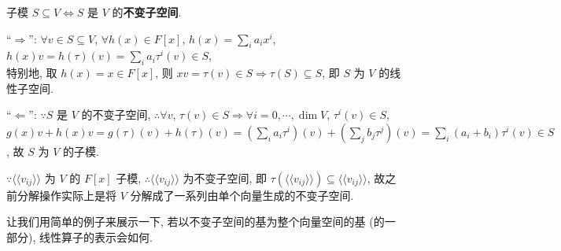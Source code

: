 \documentclass{note}
\begin{document}
\begin{thm}[(课本定理 7.5)]
    子模 $S\subseteq V\Longleftrightarrow S$ 是 $V$ 的\textbf{不变子空间}.
\end{thm}
\begin{pf}
    ``$\Longrightarrow$'': $\forall v\in S\subseteq V$, $\forall h(x)\in F[x]$, $h(x)=\sum_ia_ix^i$, $h(x)v=h(\tau)(v)=\sum_ia_i\tau^i(v)\in S$,\\
    特别地, 取 $h(x)=x\in F[x]$, 则 $xv=\tau(v)\in S\Longrightarrow\tau(S)\subseteq S$, 即 $S$ 为 $V$ 的线性子空间.

    ``$\Longleftarrow$'': $\because S$ 是 $V$ 的不变子空间, $\therefore\forall v$, $\tau(v)\in S\Longrightarrow\forall i=0,\cdots,\dim V$, $\tau^i(v)\in S$,\\
    $g(x)v+h(x)v=g(\tau)(v)+h(\tau)(v)=\left(\sum_ia_i\tau^i\right)(v)+\left(\sum_jb_j\tau^j\right)(v)=\sum_i(a_i+b_i)\tau^i(v)\in S$, 故 $S$ 为 $V$ 的子模.
\end{pf}

$\because\langle\langle v_{ij}\rangle\rangle$ 为 $V$ 的 $F[x]$ 子模, $\therefore\langle\langle v_{ij}\rangle\rangle$ 为不变子空间, 即 $\tau(\langle\langle v_{ij}\rangle\rangle)\subseteq\langle\langle v_{ij}\rangle\rangle$, 故之前分解操作实际上是将 $V$ 分解成了一系列由单个向量生成的不变子空间.

让我们用简单的例子来展示一下, 若以不变子空间的基为整个向量空间的基 (的一部分), 线性算子的表示会如何.
\end{document}
